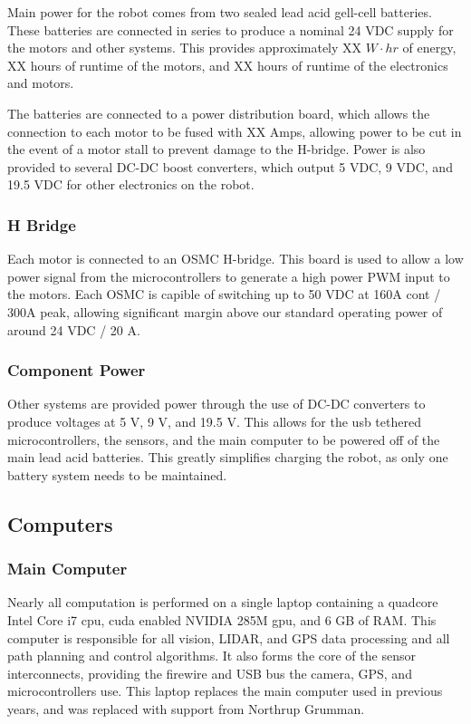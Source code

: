 Main power for the robot comes from two sealed lead acid gell-cell batteries. These batteries are connected in series to produce a nominal 24 VDC supply for the motors and other systems. This provides approximately XX $W \cdot hr$ of energy, XX hours of runtime of the motors, and XX hours of runtime of the electronics and motors.

The batteries are connected to a power distribution board, which allows the connection to each motor to be fused with XX Amps, allowing power to be cut in the event of a motor stall to prevent damage to the H-bridge. Power is also provided to several DC-DC boost converters, which output 5 VDC, 9 VDC, and 19.5 VDC for other electronics on the robot.

\subsubsection{H Bridge}

Each motor is connected to an OSMC H-bridge. This board is used to allow a low power signal from the microcontrollers to generate a high power PWM input to the motors. Each OSMC is capible of switching up to 50 VDC at 160A cont / 300A peak, allowing significant margin above our standard operating power of around 24 VDC / 20 A.

\subsubsection{Component Power}

Other systems are provided power through the use of DC-DC converters to produce voltages at 5 V, 9 V, and 19.5 V. This allows for the usb tethered microcontrollers, the sensors, and the main computer to be powered off of the main lead acid batteries. This greatly simplifies charging the robot, as only one battery system needs to be maintained.

\subsection{Computers}

\subsubsection{Main Computer}

Nearly all computation is performed on a single laptop containing a quadcore Intel Core i7 cpu, cuda enabled NVIDIA 285M gpu, and 6 GB of RAM. This computer is responsible for all vision, LIDAR, and GPS data processing and all path planning and control algorithms. It also forms the core of the sensor interconnects, providing the firewire and USB bus the camera, GPS, and microcontrollers use. This laptop replaces the main computer used in previous years, and was replaced with support from Northrup Grumman.

